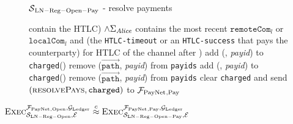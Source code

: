 \begin{figure}[H]
\begin{simulatorbox}{$\mathcal{S}{}_{\mathrm{LN - Reg - Open - Pay}}$ - resolve
  payments}
\begin{algorithmic}[1]
{              contain the HTLC) $\wedge \Sigma_{\mathit{Alice}}$ contains the most
              recent $\mathtt{remoteCom}_l$ or $\mathtt{localCom}_l$ and (the
              \texttt{HTLC-timeout} or an \texttt{HTLC-success} that pays the
              counterparty) for HTLC of the channel after \alice{})}
              \label{alg:sim:resolvepay:negligent}
                \State add (\alice, \textit{payid}) to \texttt{charged}(\alice)
                \State remove ($\overrightarrow{\mathtt{path}}$, \textit{payid})
                from \texttt{payids}
              \label{alg:sim:resolvepay:honest}
                \State add (\alice, \textit{payid}) to \texttt{charged}(\alice)
                \State remove ($\overrightarrow{\mathtt{path}}$, \textit{payid})
                from \texttt{payids}
              \EndIf
            \EndFor
          \EndFor
          \label{alg:sim:resolvepay:loopend}
        \EndIf
        \State clear \texttt{charged} and send $\left(\textsc{resolvePays},
        \mathtt{charged}\right)$ to $\mathcal{F}_{\mathrm{PayNet}}{}_{\mathrm{, Pay}}$
      \EndIndent
    \end{algorithmic}
  \end{simulatorbox}
  \caption{}
  \label{alg:sim:resolvepay}
\end{figure}

\begin{lemma}
  \label{lemma:pay}
  $\textsc{Exec}^{\mathcal{F}_{\mathrm{PayNet}}{}_{\mathrm{, Open}}, \mathcal{G}_{\mathrm{Ledger}}}_{\mathcal{S}_{\mathrm{LN
  - Reg - Open}}, \mathcal{E}} \overset{c}{\approx}
  \textsc{Exec}^{\mathcal{F}_{\mathrm{PayNet}}{}_{\mathrm{, Pay}}, \mathcal{G}_{\mathrm{Ledger}}}_{\mathcal{S}_{\mathrm{LN -
  Reg - Open - Pay}}, \mathcal{E}}$
\end{lemma}

